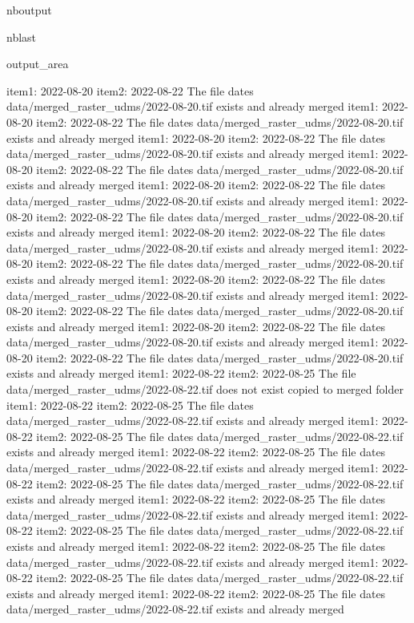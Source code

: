 \documentclass[letterpaper,10pt]{sphinxmanual}
\begin{document}
\begin{sphinxuseclass}{nboutput}
\begin{sphinxuseclass}{nblast}
{\begin{sphinxuseclass}{output_area}
\begin{sphinxuseclass}{}
\begin{sphinxVerbatim}[commandchars=\\\{\}]
item1:  2022-08-20
item2:  2022-08-22
The file dates data/merged\_raster\_udms/2022-08-20.tif exists and already merged
item1:  2022-08-20
item2:  2022-08-22
The file dates data/merged\_raster\_udms/2022-08-20.tif exists and already merged
item1:  2022-08-20
item2:  2022-08-22
The file dates data/merged\_raster\_udms/2022-08-20.tif exists and already merged
item1:  2022-08-20
item2:  2022-08-22
The file dates data/merged\_raster\_udms/2022-08-20.tif exists and already merged
item1:  2022-08-20
item2:  2022-08-22
The file dates data/merged\_raster\_udms/2022-08-20.tif exists and already merged
item1:  2022-08-20
item2:  2022-08-22
The file dates data/merged\_raster\_udms/2022-08-20.tif exists and already merged
item1:  2022-08-20
item2:  2022-08-22
The file dates data/merged\_raster\_udms/2022-08-20.tif exists and already merged
item1:  2022-08-20
item2:  2022-08-22
The file dates data/merged\_raster\_udms/2022-08-20.tif exists and already merged
item1:  2022-08-20
item2:  2022-08-22
The file dates data/merged\_raster\_udms/2022-08-20.tif exists and already merged
item1:  2022-08-20
item2:  2022-08-22
The file dates data/merged\_raster\_udms/2022-08-20.tif exists and already merged
item1:  2022-08-20
item2:  2022-08-22
The file dates data/merged\_raster\_udms/2022-08-20.tif exists and already merged
item1:  2022-08-20
item2:  2022-08-22
The file dates data/merged\_raster\_udms/2022-08-20.tif exists and already merged
item1:  2022-08-22
item2:  2022-08-25
The file data/merged\_raster\_udms/2022-08-22.tif does not exist copied to merged folder
item1:  2022-08-22
item2:  2022-08-25
The file dates data/merged\_raster\_udms/2022-08-22.tif exists and already merged
item1:  2022-08-22
item2:  2022-08-25
The file dates data/merged\_raster\_udms/2022-08-22.tif exists and already merged
item1:  2022-08-22
item2:  2022-08-25
The file dates data/merged\_raster\_udms/2022-08-22.tif exists and already merged
item1:  2022-08-22
item2:  2022-08-25
The file dates data/merged\_raster\_udms/2022-08-22.tif exists and already merged
item1:  2022-08-22
item2:  2022-08-25
The file dates data/merged\_raster\_udms/2022-08-22.tif exists and already merged
item1:  2022-08-22
item2:  2022-08-25
The file dates data/merged\_raster\_udms/2022-08-22.tif exists and already merged
item1:  2022-08-22
item2:  2022-08-25
The file dates data/merged\_raster\_udms/2022-08-22.tif exists and already merged
item1:  2022-08-22
item2:  2022-08-25
The file dates data/merged\_raster\_udms/2022-08-22.tif exists and already merged
item1:  2022-08-22
item2:  2022-08-25
The file dates data/merged\_raster\_udms/2022-08-22.tif exists and already merged

\end{sphinxVerbatim}
\end{sphinxuseclass}
\end{sphinxuseclass}}
\end{sphinxuseclass}
\end{sphinxuseclass}
\end{document}
